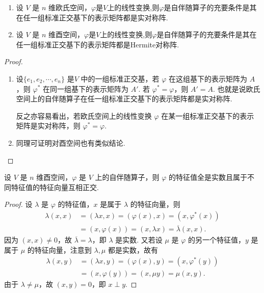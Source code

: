 \documentclass[../../main.tex]{subfiles}%
\begin{document}
\begin{theorem}\label{theorem:内积空间的自伴随算子关于表示矩阵的充要条件}
\begin{enumerate}
\item 设 $V$ 是 $n$ 维欧氏空间，$\varphi$是$V$上的线性变换,则$\varphi$是自伴随算子的充要条件是其在任一组标准正交基下的表示矩阵都是实对称阵.

\item 设 $V$ 是 $n$ 维酉空间，$\varphi$是$V$上的线性变换,则$\varphi$是自伴随算子的充要条件是其在任一组标准正交基下的表示矩阵都是Hermite对称阵. 
\end{enumerate}
\end{theorem}
\begin{proof}
\begin{enumerate}
\item 设$\{e_1,e_2,\cdots,e_n\}$ 是$V$ 中的一组标准正交基，若 $\varphi$ 在这组基下的表示矩阵为 $A$，则 $\varphi^*$ 在同一组基下的表示矩阵为 $A'$. 若 $\varphi^* = \varphi$，则 $A' = A$. 也就是说欧氏空间上的自伴随算子在任一组标准正交基下的表示矩阵都是实对称阵.

反之亦容易看出，若欧氏空间上的线性变换 $\varphi$ 在某一组标准正交基下的表示矩阵是实对称阵，则 $\varphi^* = \varphi$.

\item 同理可证明对酉空间也有类似结论. 
\end{enumerate}

\end{proof}

\begin{theorem}\label{theorem:Hermite算子关于特征值的相关性质}
设 $V$ 是 $n$ 维酉空间，$\varphi$ 是 $V$ 上的自伴随算子，则 $\varphi$ 的特征值全是实数且属于不同特征值的特征向量互相正交.
\end{theorem}
\begin{proof}

设 $\lambda$ 是 $\varphi$ 的特征值，$x$ 是属于 $\lambda$ 的特征向量，则
\begin{align*}
\lambda(x,x) &= (\lambda x,x) = (\varphi(x),x) = (x,\varphi^*(x))\\
&= (x,\varphi(x)) = (x,\lambda x) = \overline{\lambda}(x,x).
\end{align*}
因为 $(x,x) \neq 0$，故 $\overline{\lambda} = \lambda$，即 $\lambda$ 是实数. 又若设 $\mu$ 是 $\varphi$ 的另一个特征值，$y$ 是属于 $\mu$ 的特征向量，注意到 $\lambda,\mu$ 都是实数，故有
\begin{align*}
\lambda(x,y) &= (\lambda x,y) = (\varphi(x),y) = (x,\varphi^*(y))\\
&= (x,\varphi(y)) = (x,\mu y) = \mu(x,y).
\end{align*}
由于 $\lambda \neq \mu$，故 $(x,y) = 0$，即 $x \perp y$.

\end{proof}
\end{document}
